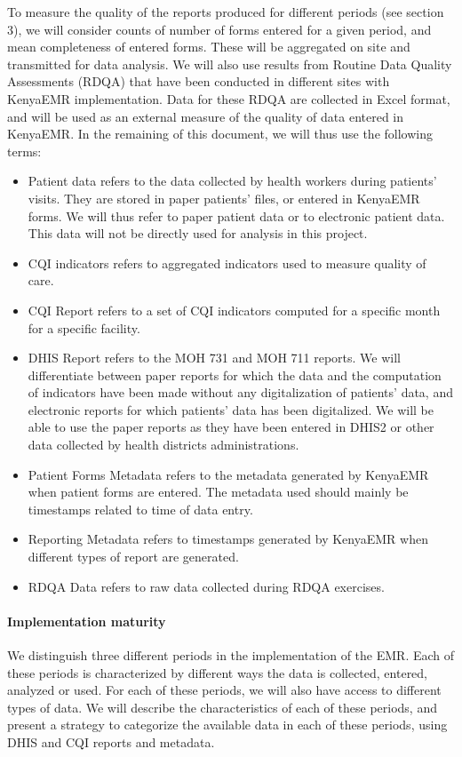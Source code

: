 \documentclass[a4paper,11pt,final,twoside]{article}
\begin{document}
To measure the quality of the reports produced for different periods (see section 3), we will consider counts of number of forms entered for a given period, and mean completeness of entered forms. These will be aggregated on site and transmitted for data analysis. We will also use results from Routine Data Quality Assessments (RDQA) that have been conducted in different sites with KenyaEMR implementation. Data for these RDQA are collected in Excel format, and will be used as an external measure of the quality of data entered in KenyaEMR.
In the remaining of this document, we will thus use the following terms:
\begin{itemize}
\item Patient data refers to the data collected by health workers during patients’ visits. They are stored in paper patients’ files, or entered in KenyaEMR forms. We will thus refer to paper patient data or to electronic patient data. This data will not be directly used for analysis in this project.
\item CQI indicators refers to aggregated indicators used to measure quality of care.
\item CQI Report refers to a set of CQI indicators computed for a specific month for a specific facility.
\item DHIS Report refers to the MOH 731 and MOH 711 reports. We will differentiate between paper reports for which the data and the computation of indicators have been made without any digitalization of patients’ data, and electronic reports for which patients’ data has been digitalized. We will be able to use the paper reports as they have been entered in DHIS2 or other data collected by health districts administrations.
\item Patient Forms Metadata refers to the metadata generated by KenyaEMR when patient forms are entered. The metadata used should mainly be timestamps related to time of data entry.
\item Reporting Metadata refers to timestamps generated by KenyaEMR when different types of report are generated.
\item RDQA Data refers to raw data collected during RDQA exercises.
\end{itemize}

\paragraph{Implementation maturity}

We distinguish three different periods in the implementation of the EMR. Each of these periods is characterized by different ways the data is collected, entered, analyzed or used. For each of these periods, we will also have access to different types of data. We will describe the characteristics of each of these periods, and present a strategy to categorize the available data in each of these periods, using DHIS and CQI reports and metadata.
\end{document}
